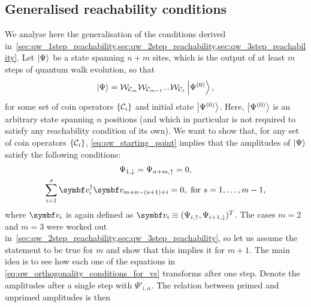 \subsection{Generalised reachability conditions}
\label{sec:qw_reachability_conditions}

We analyse here the generalisation of the conditions derived in~\cref{sec:qw_1step_reachability,sec:qw_2step_reachability,sec:qw_3step_reachability}.
Let $\ket\Psi$ be a state spanning $n+m$ sites, which is the output of at least $m$ steps of quantum walk evolution, so that
\begin{equation}
	\ket\Psi =
	{\mathcal{W}}_{{\mathcal{C}}_{m}} {\mathcal{W}}_{{\mathcal{C}}_{m-1}} ... {\mathcal{W}}_{{\mathcal{C}}_{1}}
    \ket{\Psi^{(0)}},
	\label{eq:qw_starting_point}
\end{equation}
for some set of coin operators $\{{\mathcal{C}}_i \}$ and initial state $\ket{\Psi^{(0)}}$.
Here, $\ket{\Psi^{(0)}}$ is an arbitrary state spanning $n$ positions (and which in particular is not required to satisfy any reachability condition of its own).
We want to show that, for any set of coin operators $\{{\mathcal{C}}_i \}$, \cref{eq:qw_starting_point} implies that the amplitudes of $\ket\Psi$ satisfy the following conditions:
\begin{gather}
	\Psi_{1,\downarrow} = \Psi_{n+m, \uparrow} = 0,
    \label{eq:qw_vanishing_amplitudes}
	\\
    \sum_{i=1}^s \bs v_i^\dagger \bs v_{m+n-(s+1)+i} = 0,
	\text{ for } s=1,\ldots, m-1,
	\label{eq:qw_orthogonality_conditions_for_vs}
\end{gather}
where $\bs v_{i}$ is again defined as
$\bs v_i \equiv (\Psi_{i,\uparrow}, \Psi_{i+1, \downarrow})^T$.
The cases $m=2$ and $m=3$ were worked out in~\cref{sec:qw_2step_reachability,sec:qw_3step_reachability},
so let us assume the statement to be true for $m$ and show that this implies it for $m+1$.
The main idea is to see how each one of the equations in \cref{eq:qw_orthogonality_conditions_for_vs} transforms after one step.
Denote the amplitudes after a single step with $\Psi'_{i,\alpha}$.
The relation between primed and unprimed amplitudes is then
